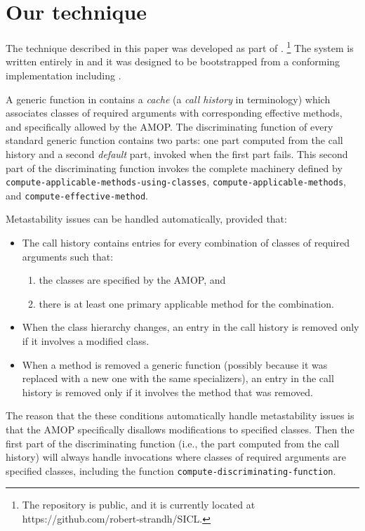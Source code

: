 \section{Our technique}

The technique described in this paper was developed as part of
\sicl{}.%
\footnote{The \sicl{} repository is public, and it is currently
  located at https://github.com/robert-strandh/SICL.}  The system is
written entirely in \cl{} and it was designed to be bootstrapped 
from a conforming \cl{} implementation including \clos{}.  

A generic function in \sicl{} contains a \emph{cache} (a \emph{call
  history} in \sicl{} terminology) which associates classes of
required arguments with corresponding effective methods, and
specifically allowed by the AMOP.  The discriminating function of
every standard generic function contains two parts: one part computed
from the call history and a second \emph{default} part, invoked when
the first part fails.  This second part of the discriminating function
invokes the complete machinery defined by
\texttt{compute-applicable-methods-using-classes},
\texttt{compute-applicable-methods}, and
\texttt{compute-effective-method}.

Metastability issues can be handled automatically, provided that:

\begin{itemize}
\item The call history contains entries for every combination of
  classes of required arguments such that:
  \begin{enumerate}
  \item the classes are specified by the AMOP, and 
  \item there is at least one primary applicable method for the
    combination.
  \end{enumerate}
\item When the class hierarchy changes, an entry in the call history
  is removed only if it involves a modified class.
\item When a method is removed a generic function (possibly because it
  was replaced with a new one with the same specializers), an entry in
  the call history is removed only if it involves the method that was
  removed.
\end{itemize}

The reason that the these conditions automatically handle
metastability issues is that the AMOP specifically disallows
modifications to specified classes.  Then the first part of the
discriminating function (i.e., the part computed from the call
history) will always handle invocations where classes of required
arguments are specified classes, including the function
\texttt{compute-discriminating-function}. 

